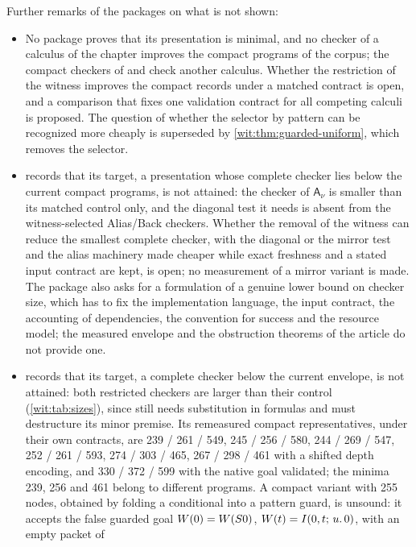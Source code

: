 Further remarks of the packages on what is not shown:
\begin{itemize}
\item No package proves that its presentation is minimal, and no checker of
 a calculus of the chapter improves the compact programs of the corpus; the
 compact checkers of  and
  check another calculus.  Whether the restriction of the witness
 improves the compact records under a matched contract is open, and a
 comparison that fixes one validation contract for all competing calculi is
 proposed.  The question of  whether the
 selector by pattern can be recognized more cheaply is superseded by
 \cref{wit:thm:guarded-uniform}, which removes the selector.
\item {} records that its target, a presentation
 whose complete checker lies below the current compact programs, is not
 attained: the checker of $\mathsf{A}_{\nu}$ is smaller than its matched
 control only, and the diagonal test it needs is absent from the
 witness-selected Alias/Back checkers.  Whether the removal of the witness
 can reduce the smallest complete checker, with the diagonal or the mirror
 test and the alias machinery made cheaper while exact freshness and a
 stated input contract are kept, is open; no measurement of a mirror
 variant is made.  The package also asks for a formulation of a genuine
 lower bound on checker size, which has to fix the implementation
 language, the input contract, the accounting of dependencies, the
 convention for success and the resource model; the measured envelope and
 the obstruction theorems of the article do not provide one.
\item {} records that its target, a complete
 checker below the current envelope, is not attained: both restricted
 checkers are larger than their control (\cref{wit:tab:sizes}), since
  still needs substitution in formulas and 
 must destructure its minor premise.  Its remeasured compact
 representatives, under their own contracts, are 239 / 261 / 549,
 245 / 256 / 580, 244 / 269 / 547, 252 / 261 / 593, 274 / 303 / 465,
 267 / 298 / 461 with a shifted depth encoding, and 330 / 372 / 599 with
 the native goal validated; the minima 239, 256 and 461 belong to different
 programs.  A compact variant with 255 nodes, obtained by folding a
 conditional into a pattern guard, is unsound: it accepts the false guarded
 goal $W(0)=W(S 0)$, $W(t)=I(0,t;\,u.\,0)$, with an empty packet of

\end{itemize}
